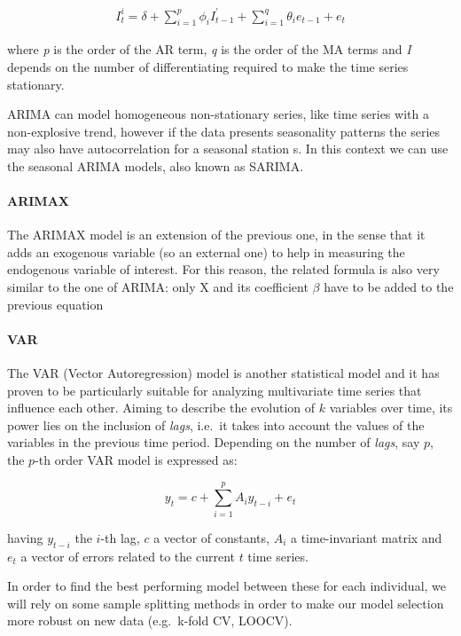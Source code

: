 \documentclass[
  12pt,
]{article}
\begin{document}
\begin{align}
I^i_t = \delta + \sum_{i=1}^p \phi_i I_{t-1}^{'} + \sum_{i=1}^q \theta_i e_{t-1}+e_t
\end{align}

where \emph{p} is the order of the AR term, \emph{q} is the order of the
MA terms and \emph{I} depends on the number of differentiating required
to make the time series stationary.

ARIMA can model homogeneous non-stationary series, like time series with
a non-explosive trend, however if the data presents seasonality patterns
the series may also have autocorrelation for a seasonal station s. In
this context we can use the seasonal ARIMA models, also known as SARIMA.

\paragraph{ARIMAX}

The ARIMAX model is an extension of the previous one, in the sense that
it adds an exogenous variable (so an external one) to help in measuring
the endogenous variable of interest. For this reason, the related
formula is also very similar to the one of ARIMA: only X and its
coefficient \(\beta\) have to be added to the previous equation

\paragraph{VAR}

The VAR (Vector Autoregression) model is another statistical model and
it has proven to be particularly suitable for analyzing multivariate
time series that influence each other. Aiming to describe the evolution
of \(k\) variables over time, its power lies on the inclusion of
\emph{lags}, i.e.~it takes into account the values of the variables in
the previous time period. Depending on the number of \emph{lags}, say
\(p\), the \(p\)-th order VAR model is expressed as:

\[
y_t = c + \sum_{i=1}^{p} A_i y_{t-i} + e_t
\]

having \(y_{t-i}\) the \(i\)-th lag, \(c\) a vector of constants,
\(A_i\) a time-invariant matrix and \(e_t\) a vector of errors related
to the current \(t\) time series.

In order to find the best performing model between these for each
individual, we will rely on some sample splitting methods in order to
make our model selection more robust on new data (e.g.~k-fold CV,
LOOCV).
\end{document}
